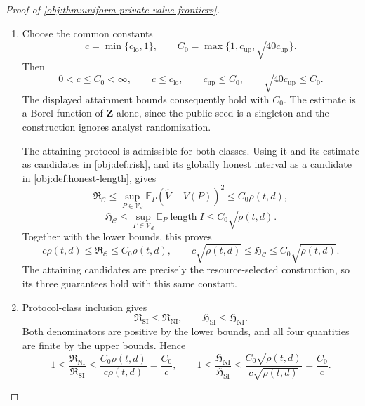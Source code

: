 \documentclass[11pt]{article}
\begin{document}
\begin{proof}[Proof of \cref{obj:thm:uniform-private-value-frontiers}]
\begin{enumerate}
For \(V(P)\in[1/4,3/4]\), failure of coverage implies
\(|\widehat V-V(P)|>q_*\). Markov's inequality therefore gives
\[
\Pr_P\{V(P)\notin I\}
\le\Pr_P\{(\widehat V-V(P))^2\ge q_*^2\}
\le\frac{10^{16}\rho(t,d)}{10^{17}\rho(t,d)}
=\frac1{10}.
\]
Clipping the endpoints gives
\[
\operatorname{length}I\le2q_*
=\sqrt{40c_{\mathrm{up}}}\,\sqrt{\rho(t,d)}.
\]
Thus the same noninteractive protocol, transcript-only estimator, and interval simultaneously satisfy
\[
\mathbb E_P(\widehat V-V(P))^2\le c_{\mathrm{up}}\rho(t,d),
\qquad
\Pr_P\{V(P)\in I\}\ge0.90,
\qquad
\mathbb E_P\operatorname{length}I
\le\sqrt{40c_{\mathrm{up}}}\,\sqrt{\rho(t,d)}.
\]
These hold for every \(P\in\mathcal V_d\), including the \(n=2\) branch.

\item
Choose the common constants
\[
c=\min\{c_{\mathrm{lo}},1\},
\qquad
C_0=\max\{1,c_{\mathrm{up}},\sqrt{40c_{\mathrm{up}}}\}.
\]
Then
\[
0<c\le C_0<\infty,\qquad
c\le c_{\mathrm{lo}},\qquad
c_{\mathrm{up}}\le C_0,\qquad
\sqrt{40c_{\mathrm{up}}}\le C_0.
\]
The displayed attainment bounds consequently hold with \(C_0\).
The estimate is a Borel function of \(\mathbf Z\) alone, since the public seed is a singleton and the construction ignores analyst randomization.

The attaining protocol is admissible for both classes. Using it and its estimate as candidates in \cref{obj:def:risk}, and its globally honest interval as a candidate in \cref{obj:def:honest-length}, gives
\[
\mathfrak R_{\mathcal C}
\le\sup_{P\in\mathcal V_d}\mathbb E_P(\widehat V-V(P))^2
\le C_0\rho(t,d),
\]
\[
\mathfrak H_{\mathcal C}
\le\sup_{P\in\mathcal V_d}\mathbb E_P\operatorname{length}I
\le C_0\sqrt{\rho(t,d)}.
\]
Together with the lower bounds, this proves
\[
c\rho(t,d)\le\mathfrak R_{\mathcal C}\le C_0\rho(t,d),
\qquad
c\sqrt{\rho(t,d)}
\le\mathfrak H_{\mathcal C}\le C_0\sqrt{\rho(t,d)}.
\]
The attaining candidates are precisely the resource-selected construction, so its three guarantees hold with this same constant.

\item
Protocol-class inclusion gives
\[
\mathfrak R_{\mathrm{SI}}\le\mathfrak R_{\mathrm{NI}},
\qquad
\mathfrak H_{\mathrm{SI}}\le\mathfrak H_{\mathrm{NI}}.
\]
Both denominators are positive by the lower bounds, and all four quantities are finite by the upper bounds. Hence
\[
1\le\frac{\mathfrak R_{\mathrm{NI}}}{\mathfrak R_{\mathrm{SI}}}
\le\frac{C_0\rho(t,d)}{c\rho(t,d)}
=\frac{C_0}{c},
\qquad
1\le\frac{\mathfrak H_{\mathrm{NI}}}{\mathfrak H_{\mathrm{SI}}}
\le\frac{C_0\sqrt{\rho(t,d)}}{c\sqrt{\rho(t,d)}}
=\frac{C_0}{c}.
\]


\end{enumerate}
\end{proof}
\end{document}
